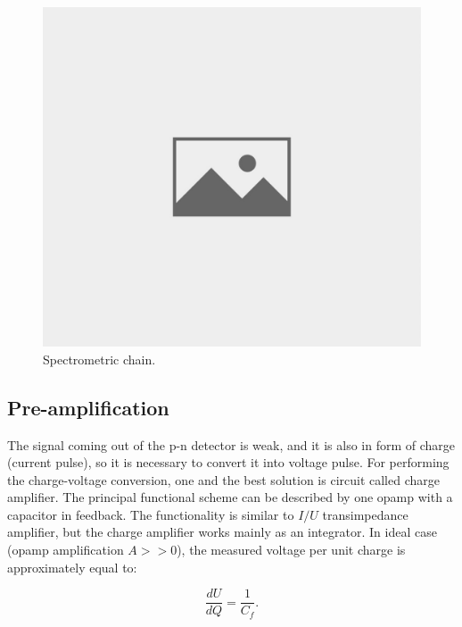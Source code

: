 \begin{figure}[H]
 \centering
 \includegraphics[scale=0.35, angle = 0]{./pictures/NoPicture.jpg}
 \caption{Spectrometric chain.}
 \label{trans}
 
\end{figure}

\subsection{Pre-amplification}
The signal coming out of the p-n detector is weak, and it is also in form of charge (current pulse), so it is necessary to convert it into voltage pulse. For performing the charge-voltage conversion, one and the best solution is circuit called charge amplifier. The principal functional scheme can be described by one opamp with a capacitor in feedback. The functionality is similar to $I/U$ transimpedance amplifier, but the charge amplifier works mainly as an integrator. In ideal case (opamp amplification $A >> 0$), the measured voltage per unit charge is approximately equal to:

\begin{equation}
\frac{dU}{dQ} = \frac{1}{C_{f}}.
\end{equation}


